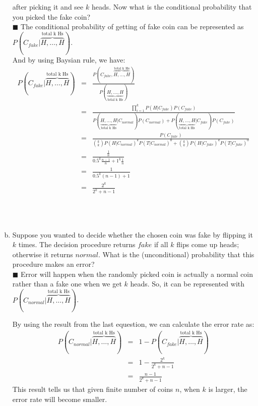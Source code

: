 \documentclass{article}
\newcommand{\solution}[1]{~\\ $\blacksquare$ \sffamily\upshape\selectfont #1
\normalfont ~\\~ }
\begin{document}
\begin{enumerate}[a.]
    after picking it and see $k$ heads. Now what is the conditional
    probability that you picked the fake coin?
    \solution{The conditional probability of getting of fake coin can
      be represented as $P(C_{fake}|\overbrace{H,\ldots,H}^\text{total
        k Hs})$. \\
      And by using Baysian rule, we have: \\
      \begin{eqnarray*}
        P(C_{fake}|\overbrace{H,\ldots,H}^\text{total k Hs}) & = &
        \frac{P(C_{fake},\overbrace{H,\ldots,H}^\text{total k
            Hs})}{P(\underbrace{H,\ldots,H}_\text{total k Hs})} \\
        & = & \frac{\prod_{i=1}^k P(H|C_{fake})P(C_{fake})}
        {P(\underbrace{H,\ldots,H}_{\mbox{total k Hs}}|C_{normal})P(C_{normal}) 
          + P(\underbrace{H,\ldots,H}_{\mbox{total k Hs}}|C_{fake})P(C_{fake})} \\
        & = & \frac{P(C_{fake})}{{k \choose
            k}P(H|C_{normal})^kP(T|C_{normal})^0 + {k \choose
            k}P(H|C_{fake})^kP(T|C_{fake})^0}  \\
        & = & \frac{\frac{1}{n}}{0.5^k\frac{n-1}{n}+1^k\frac{1}{n}} \\
        & = & \frac{1}{0.5^k(n-1)+1} \\
        & = & \frac{2^k}{2^k+n-1}
      \end{eqnarray*}
} 
  \item Suppose you wanted to decide whether the chosen coin was fake by
    flipping it $k$ times.  The decision procedure returns $fake$ if all $k$
    flips come up heads; otherwise it returns $normal$. What is the
    (unconditional) probability that this procedure makes an error?
    \solution{Error will happen when the randomly picked coin is
      actually a normal coin rather than a fake one when we get $k$
      heads. So, it can be represented with
      $P(C_{normal}|\overbrace{H,\ldots,H}^{\mbox{total k Hs}})$.

      By using the result from the last equestion, we can calculate
      the error rate as: \\
      \begin{eqnarray*}
        P(C_{normal}|\overbrace{H,\ldots,H}^{\mbox{total k Hs}}) & = & 
        1 - P(C_{fake}|\overbrace{H,\ldots,H}^{\mbox{total k Hs}}) \\
        & = & 1 - \frac{2^k}{2^k+n-1} \\
        & = & \frac{n-1}{2^k+n-1}
      \end{eqnarray*}
      This result tells us that given finite number of coins $n$, when
      $k$ is larger, the error rate will become smaller. 
    }
\end{enumerate}
\end{document}
